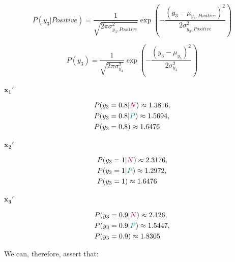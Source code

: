 \documentclass[12pt]{article}
\begin{document}
\begin{enumerate}[leftmargin=\labelsep]
        $$
          P(y_3 | Positive) = \frac{1}{\sqrt{2 \pi \sigma_{y_3, Positive}^2}} \exp \left( - \frac{(y_3 - \mu_{y_3, Positive})^2}{2 \sigma_{y_3, Positive}^2} \right)
        $$

        $$
          P(y_3) = \frac{1}{\sqrt{2 \pi \sigma_{y_3}^2}} \exp \left( - \frac{(y_3 - \mu_{y_3})^2}{2 \sigma_{y_3}^2} \right)
        $$

        \begin{multicols}{3}
          \setlength{\columnseprule}{1pt}
          \def\columnseprulecolor{\color{black}}
          \centering

          $\mathbf{x_1'}$

          $$
            \begin{aligned}
               & P(y_3 = 0.8 | \textcolor{purple}{N}) \approx 1.3816, \\
               & P(y_3 = 0.8 | \textcolor{teal}{P}) \approx 1.5694,   \\
               & P(y_3 = 0.8) \approx 1.6476
            \end{aligned}
          $$

          \columnbreak

          $\mathbf{x_2'}$

          $$
            \begin{aligned}
               & P(y_3 = 1 | \textcolor{purple}{N}) \approx 2.3176, \\
               & P(y_3 = 1 | \textcolor{teal}{P}) \approx 1.2972,   \\
               & P(y_3 = 1) \approx 1.6476
            \end{aligned}
          $$

          \columnbreak

          $\mathbf{x_3'}$

          $$
            \begin{aligned}
               & P(y_3 = 0.9 | \textcolor{purple}{N}) \approx 2.126, \\
               & P(y_3 = 0.9 | \textcolor{teal}{P}) \approx 1.5447,  \\
               & P(y_3 = 0.9) \approx 1.8305
            \end{aligned}
          $$

        \end{multicols}

        \pagebreak

        We can, therefore, assert that:


\end{enumerate}
\end{document}
